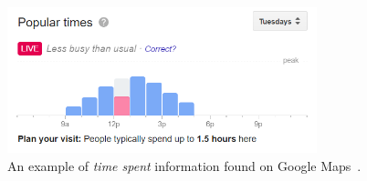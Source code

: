 	\begin{figure}[!ht]
		\centering
		\includegraphics[width=0.8\textwidth]{graphics/google_visit_duration.png}
		\caption{An example of \textit{time spent} information found on Google Maps~\protect\cite{google_business}.}
		\label{fig:visit_duration}
	\end{figure}
	
